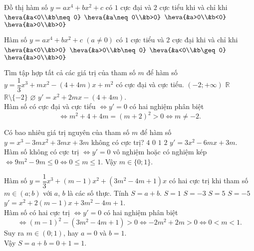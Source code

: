 \begin{ex}%
	Đồ thị hàm số $y=ax^4+bx^2+c$ có $1$ cực đại và $2$ cực tiểu khi và chỉ khi
	\choice
	{$\heva{&a<0\\&b\neq 0}$}
	{$\heva{&a\neq 0\\&b>0}$}
	{\True $\heva{&a>0\\&b<0}$}
	{$\heva{&a>0\\&b>0}$}
\loigiai
{
}
\end{ex}
\begin{ex}%
	Hàm số $y=ax^4+bx^2+c$ $(a\neq 0)$ có $1$ cực tiểu và $2$ cực đại khi và chỉ khi
	\choice
	{\True $\heva{&a<0\\&b>0}$}
	{$\heva{&a>0\\&b\neq 0}$}
	{$\heva{&a<0\\&b\geq 0}$}
	{$\heva{&a>0\\&b>0}$}
\loigiai
{
}
\end{ex}
\begin{ex}%
	Tìm tập hợp tất cả các giá trị của tham số $m$ để hàm số $y=\dfrac{1}{3}x^3+mx^2-(4+4m)x+m^2$ có cực đại và cực tiểu. 
	\choice
	{$(-2;+\infty)$}
	{$\mathbb{R}$}
	{\True $\mathbb{R}\setminus\{-2\}$}
	{$\varnothing$}
\loigiai
{
$y'=x^2+2mx-(4+4m)$. \\
Hàm số có cực đại và cực tiểu $\Leftrightarrow y'=0$ có hai nghiệm phân biệt 
\[\Leftrightarrow m^2+4+4m=\left(m+2\right)^2>0\Leftrightarrow m\neq-2.\]
}
\end{ex}
\begin{ex}%
	Có bao nhiêu giá trị nguyên của tham số $m$ để hàm số $y=x^3-3mx^2+3mx+3m$ không có cực trị?
	\choice
	{$4$}
	{$0$}
	{$1$}
	{\True $2$}
\loigiai
{
$y'=3x^2-6mx+3m$. \\
Hàm số không có cực trị $\Leftrightarrow y'=0$ vô nghiệm hoặc có nghiệm kép $\Leftrightarrow 9m^2-9m\leq0\Leftrightarrow0\leq m\leq1$.
Vậy $m\in\{0;1\}$.
}
\end{ex}
\begin{ex}%
	Hàm số $y=\dfrac{1}{3}x^3+(m-1)x^2+\left(3m^2-4m+1\right)x$ có hai cực trị khi tham số $m\in(a;b)$ với $a$, $b$ là các số thực. Tính $S=a+b$. 
	\choice
	{\True $S=1$}
	{$S=-3$}
	{$S=5$}
	{$S=-5$}
\loigiai
{
$y'=x^2+2(m-1)x+3m^2-4m+1$. \\
Hàm số có hai cực trị $\Leftrightarrow y'=0$ có hai nghiệm phân biệt
\[\Leftrightarrow\left(m-1\right)^2-\left(3m^2-4m+1\right)>0\Leftrightarrow-2m^2+2m>0\Leftrightarrow0<m<1.\]
Suy ra $m\in(0;1)$, hay $a=0$ và $b=1$.\\
Vậy $S=a+b=0+1=1$.
}
\end{ex}
